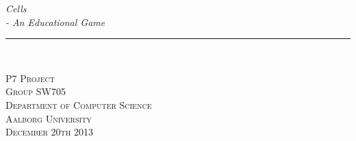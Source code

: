\thispagestyle{empty}
\begin{flushright}
\vspace{3cm}

\phantom{hul}

\phantom{hul}

\phantom{hul}

\textsl{\Huge Cells}\\ \vspace{0.3cm}
\textsl{\Huge - An Educational Game} \vspace{0.5cm}

\rule{13cm}{3mm} \\ \vspace{1.5cm}
\vspace{1cm}


\vspace{1.5cm} 
\textsc{\Large P7 Project \\
Group SW705 \\
Department of Computer Science\\
Aalborg University\\
December 20th 2013\\}
\end{flushright}
